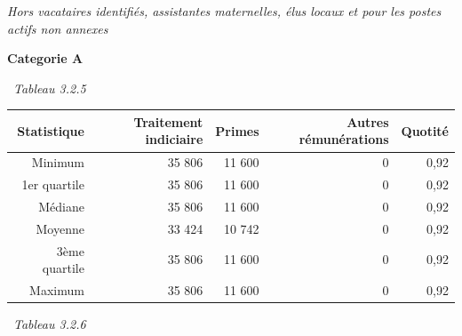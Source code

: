\emph{Hors vacataires identifiés, assistantes maternelles, élus locaux
et pour les postes actifs non annexes}

\textbf{Categorie A}

~\emph{Tableau 3.2.5}

\begin{longtable}[]{@{}rrrrr@{}}
\toprule
Statistique & Traitement indiciaire & Primes & Autres rémunérations &
Quotité\tabularnewline
\midrule
\endhead
Minimum & 35 806 & 11 600 & 0 & 0,92\tabularnewline
1er quartile & 35 806 & 11 600 & 0 & 0,92\tabularnewline
Médiane & 35 806 & 11 600 & 0 & 0,92\tabularnewline
Moyenne & 33 424 & 10 742 & 0 & 0,92\tabularnewline
3ème quartile & 35 806 & 11 600 & 0 & 0,92\tabularnewline
Maximum & 35 806 & 11 600 & 0 & 0,92\tabularnewline
\bottomrule
\end{longtable}

~\emph{Tableau 3.2.6}

